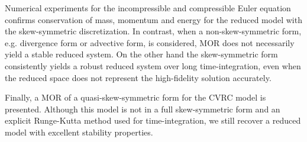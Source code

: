 Numerical experiments for the incompressible and compressible Euler equation confirms conservation of mass, momentum and energy for the reduced model with the skew-symmetric discretization. In contrast, when a non-skew-symmetric form, e.g. divergence form or advective form, is considered, MOR does not necessarily yield a stable reduced system. On the other hand the skew-symmetric form consistently yields a robust reduced system over long time-integration, even when the reduced space does not represent the high-fidelity solution accurately. 

Finally, a MOR of a quasi-skew-symmetric form for the CVRC model is presented. Although this model is not in a full skew-symmetric form and an explicit Runge-Kutta method used for time-integration, we still recover a reduced model with excellent stability properties.
